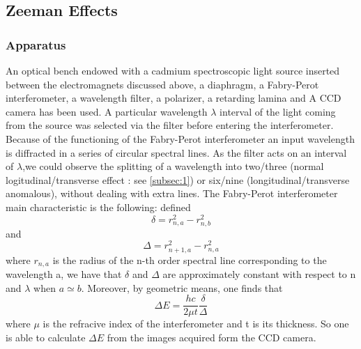 \documentclass[a4paper,12pt,abstracton]{scrartcl}
\begin{document}
\subsection{Zeeman Effects}
\subsubsection{Apparatus}
An optical bench endowed with a cadmium spectroscopic light source inserted between the electromagnets discussed above, a diaphragm, a Fabry-Perot interferometer, a wavelength filter, a polarizer, a retarding lamina and A CCD camera has been used. A particular wavelength $\lambda$ interval of the light coming from the source was selected via the filter before entering the interferometer. Because of the functioning of the Fabry-Perot interferometer an input wavelength is diffracted in a series of circular spectral lines. As the filter acts on an interval of $\lambda$,we could observe the splitting of a wavelength into two/three (normal logitudinal/transverse effect : see \ref{subsec:1}) or six/nine (longitudinal/transverse anomalous), without dealing with extra lines. The Fabry-Perot interferometer main characteristic is the following:\newline
defined $$\delta = r^2_{n,a}-r^2_{n,b}$$ and $$\Delta = r^2_{n+1,a}-r^2_{n,a}$$  where $r_{n,a}$ is the radius of the n-th order spectral line corresponding to the wavelength a, we have that $\delta$ and $\Delta$ are approximately constant with respect to n and $\lambda$ when $a\simeq b$. Moreover, by geometric means, one finds that 
\begin{equation} \label{eq:1}
\Delta E  = \frac{hc}{2\mu t} \frac{\delta}{\Delta}
\end{equation}
 where $\mu$ is the refracive index of the interferometer and t is its thickness. So one is able to calculate $\Delta E$ from the images acquired form the CCD camera.
\end{document}
